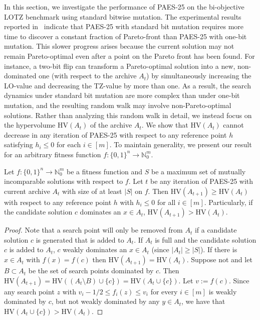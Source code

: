 \documentclass[
sigconf = false, %
review = false, %
screen = true, %
anonymous = true, %
format=acmsmall
]{acmart}
\newcommand{\hv}{\ensuremath{\mathrm{HV}}\xspace}
\newcommand{\LOTZ}{\textsc{LOTZ}\xspace}
\newcommand{\LO}{\textsc{LO}\xspace}                      %
\newcommand{\TZ}{\textsc{TZ}\xspace}
\newcommand{\PAES}{PAES-25\xspace}
\begin{document}
In this section, we investigate the performance of \PAES on the bi-objective \LOTZ benchmark using standard bitwise mutation. The experimental results reported in~\cite{Knowles2025} indicate that \PAES with standard bit mutation requires more time to discover a constant fraction of Pareto-front than \PAES with one-bit mutation. This slower progress arises because the current solution may not remain Pareto-optimal even after a point on the Pareto front has been found. For instance, a two-bit flip can transform a Pareto-optimal solution into a new, non-dominated one (with respect to the archive $A_t$) by simultaneously increasing the \LO-value and decreasing the \TZ-value by more than one. As a result, the search dynamics under standard bit mutation are more complex than under one-bit mutation, and the resulting random walk may involve non-Pareto-optimal solutions. Rather than analyzing this random walk in detail, we instead focus on the hypervolume $\hv(A_t)$ of the archive $A_t$. We show that $\hv(A_t)$ cannot decrease in any iteration of \PAES with respect to any reference point $h$ satisfying $h_i \leq 0$ for each $i \in [m]$. To maintain generality, we present our result for an arbitrary fitness function $f:\{0,1\}^n \to \mathbb{N}_0^m$. 

\begin{lemma}
\label{lem:hypervolume-not-decrease}
Let $f:\{0,1\}^n \to \mathbb{N}_0^m$ be a fitness function and $S$ be a maximum set of mutually incomparable solutions with respect to $f$. Let $t$ be any iteration of \PAES with current archive $A_t$ with size of at least $|S|$ on $f$. Then $\hv(A_{t+1}) \geq \hv(A_t)$ with respect to any reference point $h$ with $h_i \leq 0$ for all $i \in [m]$. Particularly, if the candidate solution $c$ dominates an $x \in A_t$, $\hv(A_{t+1}) > \hv(A_t)$. 
\end{lemma}

\begin{proof}
Note that a search point will only be removed from $A_t$ if a candidate solution $c$ is generated that is added to $A_t$. If $A_t$ is full and the candidate solution $c$ is added to $A_t$, $c$ weakly dominates an $x \in A_t$ (since $|A_t| \geq |S|$). If there is $x \in A_t$ with $f(x)=f(c)$ then $\hv(A_{t+1})=\hv(A_t)$. Suppose not and let $B \subset A_t$ be the set of search points dominated by $c$. Then $\hv(A_{t+1}) = \hv((A_t \setminus B) \cup \{c\}) = \hv(A_t \cup \{c\})$. Let $v:=f(c)$. Since any search point $z$ with $v_i-1/2 \leq f_i(z) \leq v_i$ for every $i \in [m]$ is weakly dominated by $c$, but not weakly dominated by any $y \in A_t$, we have that $\hv(A_t \cup \{c\}) > \hv(A_t)$. 
\end{proof}
\end{document}
